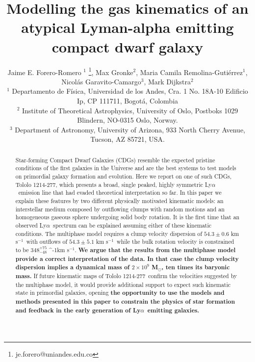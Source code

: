 \documentclass[a4paper,fleqn,usenatbib]{mnras}
\newcommand{\tol}{Tololo 1214-277}
\newcommand{\lya}{\ifmmode{{\rm Ly}\alpha}\else Ly$\alpha$\ \fi}
\newcommand{\kms}{\ifmmode\mathrm{km\ s}^{-1}\else km s$^{-1}$\fi}
\newcommand{\sigmaclump}{$54.3\pm 0.6$ km s$^{-1}$}
\newcommand{\inftyclump}{$54.3\pm 5.1$ km s$^{-1}$}
\begin{document}
\title[An atypical \lya dwarf galaxy]{
Modelling the gas kinematics of an atypical Lyman-alpha emitting compact dwarf galaxy}
\author[J.E. Forero-Romero et al.]
{Jaime E. Forero-Romero $^{1}$ \thanks{je.forero@uniandes.edu.co},
Max Gronke$^2$, 
Maria Camila Remolina-Guti\'errez$^1$,
\newauthor
Nicol\'as Garavito-Camargo$^3$, 
Mark Dijkstra$^2$\\
$^1$ Departamento de F\'isica, Universidad de los Andes, Cra. 1
  No. 18A-10 Edificio Ip, CP 111711, Bogot\'a, Colombia \\
$^2$ Institute of Theoretical Astrophysics, University of Oslo,
Postboks 1029 Blindern, NO-0315 Oslo, Norway.\\
$^3$ Department of Astronomy, University of Arizona, 933 North Cherry
Avenue, Tucson, AZ 85721, USA. 
}


\maketitle


\begin{abstract}
	
Star-forming Compact Dwarf Galaxies (CDGs) 
resemble the expected pristine conditions of the first galaxies in the
Universe and are the best systems to test models on primordial galaxy
formation and evolution. 
Here we report on one of such CDGs, \tol, which presents
a broad, single peaked, highly symmetric \lya emission line that had
evaded theoretical interpretation so far.  
In this paper we explain these features by two different physically
motivated kinematic models: 
an interstellar medium composed by outflowing clumps with 
random motions and an homogeneous gaseous sphere undergoing solid body
rotation.
It is the first time that an observed \lya spectrum can be explained
assuming either of these kinematic conditions.
The multiphase model requires a clump velocity dispersion of
\sigmaclump\ with outflows of \inftyclump\, while the
bulk rotation velocity is constrained to be $348^{+75}_{-48}$ \kms.
{\bf We argue that the results from the multiphase model 
provide a correct interpretation of the data.
In that case the clump velocity dispersion implies a dynamical mass of
$2\times 10^{9}$ M$_{\odot}$,  ten times its baryonic mass.}
If future kinematic maps of \tol\ confirm the velocities suggested by
the multiphase model, it would provide additional support to expect
such kinematic state in primordial galaxies, opening
{\bf the opportunity to use the models and methods presented in this
  paper to constrain the physics of star formation and feedback in the
  early generation of \lya emitting galaxies.} 
\end{abstract}
\end{document}
